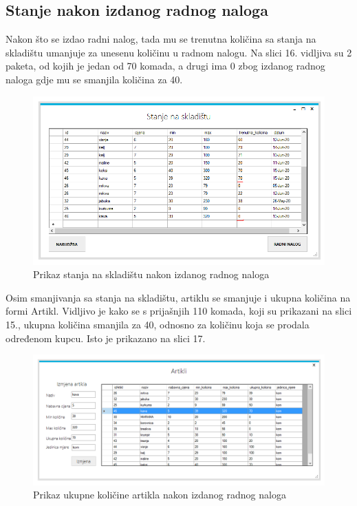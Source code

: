 \documentclass{foi}
\begin{document}
\subsection{Stanje nakon izdanog radnog naloga}
Nakon što se izdao radni nalog, tada mu se trenutna količina sa stanja na skladištu umanjuje za unesenu količinu u radnom nalogu. Na slici 16. vidljiva su 2 paketa, od kojih je jedan od 70 komada, a drugi ima 0 zbog izdanog radnog naloga gdje mu se smanjila količina za 40. 

\begin{figure}[h]
    \centering 
    \includegraphics[width=1.0\textwidth]{slike/stanje kave nakon radnog naloga.PNG}
    \caption{Prikaz stanja na skladištu nakon izdanog radnog naloga}
    \label{slika-16}
\end{figure}
\newpage
Osim smanjivanja sa stanja na skladištu, artiklu se smanjuje i ukupna količina na formi Artikl. Vidljivo je kako se s prijašnjih 110 komada, koji su prikazani na slici 15., ukupna količina smanjila za 40, odnosno za količinu koja se prodala određenom kupcu. Isto je prikazano na slici 17.

\begin{figure}[h]
    \centering 
    \includegraphics[width=1.0\textwidth]{slike/ukupna kol kave nakon radnog naloga.PNG}
    \caption{Prikaz ukupne količine artikla nakon izdanog radnog naloga}
    \label{slika-17}
\end{figure}
\end{document}
